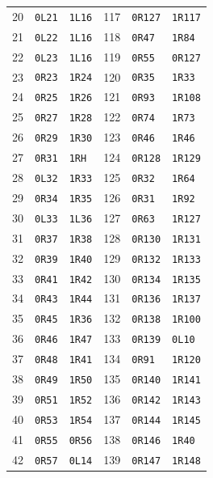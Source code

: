 {\begin{longtable}{@{}rll@{\qquad\quad}rll@{}}
20 & \texttt{0L21} & \texttt{1L16} & 117 & \texttt{0R127} & \texttt{1R117}\\
21 & \texttt{0L22} & \texttt{1L16} & 118 & \texttt{0R47} & \texttt{1R84}\\
22 & \texttt{0L23} & \texttt{1L16} & 119 & \texttt{0R55} & \texttt{0R127}\\
23 & \texttt{0R23} & \texttt{1R24} & 120 & \texttt{0R35} & \texttt{1R33}\\
24 & \texttt{0R25} & \texttt{1R26} & 121 & \texttt{0R93} & \texttt{1R108}\\
25 & \texttt{0R27} & \texttt{1R28} & 122 & \texttt{0R74} & \texttt{1R73}\\
26 & \texttt{0R29} & \texttt{1R30} & 123 & \texttt{0R46} & \texttt{1R46}\\
27 & \texttt{0R31} & \texttt{1RH} & 124 & \texttt{0R128} & \texttt{1R129}\\
28 & \texttt{0L32} & \texttt{1R33} & 125 & \texttt{0R32} & \texttt{1R64}\\
29 & \texttt{0R34} & \texttt{1R35} & 126 & \texttt{0R31} & \texttt{1R92}\\
30 & \texttt{0L33} & \texttt{1L36} & 127 & \texttt{0R63} & \texttt{1R127}\\
31 & \texttt{0R37} & \texttt{1R38} & 128 & \texttt{0R130} & \texttt{1R131}\\
32 & \texttt{0R39} & \texttt{1R40} & 129 & \texttt{0R132} & \texttt{1R133}\\
33 & \texttt{0R41} & \texttt{1R42} & 130 & \texttt{0R134} & \texttt{1R135}\\
34 & \texttt{0R43} & \texttt{1R44} & 131 & \texttt{0R136} & \texttt{1R137}\\
35 & \texttt{0R45} & \texttt{1R36} & 132 & \texttt{0R138} & \texttt{1R100}\\
36 & \texttt{0R46} & \texttt{1R47} & 133 & \texttt{0R139} & \texttt{0L10}\\
37 & \texttt{0R48} & \texttt{1R41} & 134 & \texttt{0R91} & \texttt{1R120}\\
38 & \texttt{0R49} & \texttt{1R50} & 135 & \texttt{0R140} & \texttt{1R141}\\
39 & \texttt{0R51} & \texttt{1R52} & 136 & \texttt{0R142} & \texttt{1R143}\\
40 & \texttt{0R53} & \texttt{1R54} & 137 & \texttt{0R144} & \texttt{1R145}\\
41 & \texttt{0R55} & \texttt{0R56} & 138 & \texttt{0R146} & \texttt{1R40}\\
42 & \texttt{0R57} & \texttt{0L14} & 139 & \texttt{0R147} & \texttt{1R148}\\

\end{longtable}}
